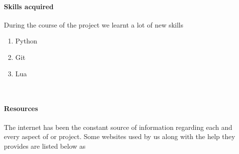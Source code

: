 \documentclass{article}
\begin{document}
\paragraph{Skills acquired}
During the course of the project we learnt a lot of new skills
	\begin{enumerate}
		\item Python
		\item Git
		\item Lua
	\end{enumerate}
\newpage \paragraph{Resources}
The internet has been the constant source of information regarding each and every aspect of or project. Some websites used by us along with the help they provides are listed below as
\end{document}
